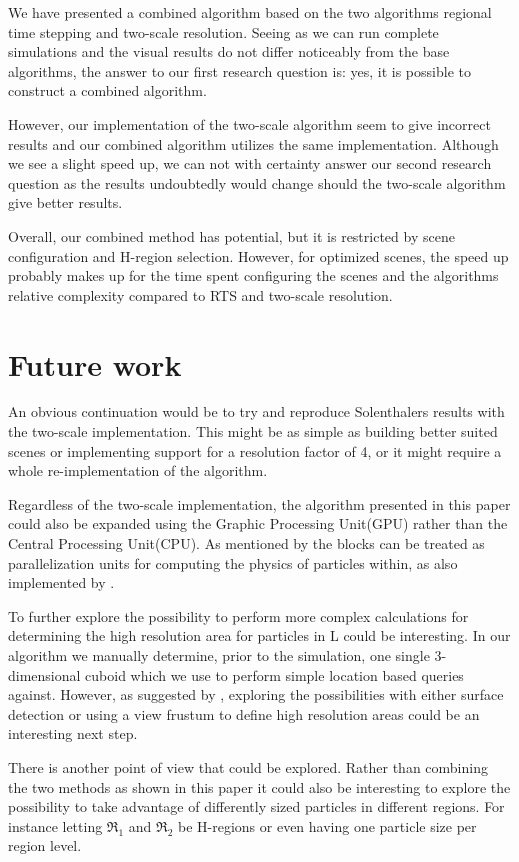 \documentclass[../../main.tex]{subfiles}
\begin{document}
\tracingall



We have presented a combined algorithm based on the two algorithms regional time stepping and two-scale resolution. Seeing as we can run complete simulations and the visual results do not differ noticeably from the base algorithms, the answer to our first research question is: yes, it is possible to construct a combined algorithm. 

However, our implementation of the two-scale algorithm seem to give incorrect results and our combined algorithm utilizes the same implementation. Although we see a slight speed up, we can not with certainty answer our second research question as the results undoubtedly would change should the two-scale algorithm give better results. 

Overall, our combined method has potential, but it is restricted by scene configuration and H-region selection. However, for optimized scenes, the speed up probably makes up for the time spent configuring the scenes and the algorithms relative complexity compared to RTS and two-scale resolution. 


\section{Future work}

An obvious continuation would be to try and reproduce Solenthalers results with the two-scale implementation. This might be as simple as building better suited scenes or implementing support for a resolution factor of 4, or it might require a whole re-implementation of the algorithm. 

Regardless of the two-scale implementation, the algorithm presented in this paper could also be expanded using the Graphic Processing Unit(GPU) rather than the Central Processing Unit(CPU). As mentioned by \citet{goswami2014regional} the blocks can be treated as parallelization units for computing the physics of particles within, as also implemented by \citet{goswami2010interactive}.

To further explore the possibility to perform more complex calculations for determining the high resolution area for particles in L could be interesting. In our algorithm we manually determine, prior to the simulation, one single 3-dimensional cuboid which we use to perform simple location based queries against. However, as suggested by \citet{solenthaler2011two}, exploring the possibilities with either surface detection or using a view frustum to define high resolution areas could be an interesting next step. 

There is another point of view that could be explored. Rather than combining the two methods as shown in this paper it could also be interesting to explore the possibility to take advantage of differently sized particles in different regions. For instance letting $\Re_1$ and $\Re_2$ be H-regions or even having one particle size per region level. 
\end{document}
